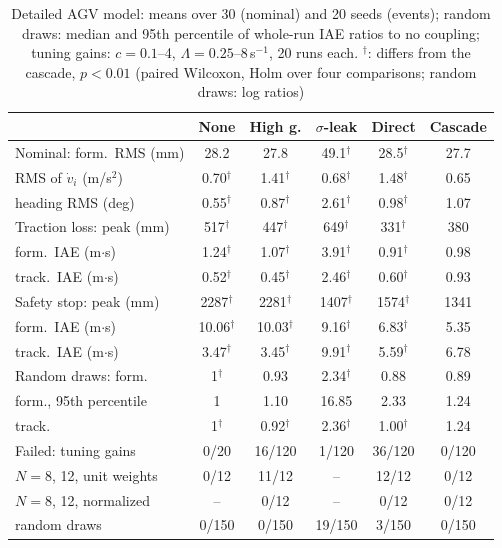 \begin{table}[t]
\caption{Detailed AGV model: means over 30 (nominal) and 20 seeds (events); random draws: median and 95th percentile of whole-run IAE ratios to no coupling; tuning gains: $c=0.1$--4, $\Lambda=0.25$--8\,s$^{-1}$, 20 runs each. $^\dagger$: differs from the cascade, $p<0.01$ (paired Wilcoxon, Holm over four comparisons; random draws: log ratios)}\label{tab:hifi}
\centering\footnotesize\renewcommand{\arraystretch}{0.94}
\setlength{\tabcolsep}{2.0pt}
\begin{tabular}{@{}lccccc@{}}
\toprule
 & None & High g. & $\sigma$-leak & Direct & Cascade\\
\midrule
Nominal: form.\ RMS (mm) & 28.2 & 27.8 & 49.1$^\dagger$ & 28.5$^\dagger$ & 27.7\\
\quad RMS of $\dot v_i$ (m/s$^2$) & 0.70$^\dagger$ & 1.41$^\dagger$ & 0.68$^\dagger$ & 1.48$^\dagger$ & 0.65\\
\quad heading RMS (deg) & 0.55$^\dagger$ & 0.87$^\dagger$ & 2.61$^\dagger$ & 0.98$^\dagger$ & 1.07\\
Traction loss: peak (mm) & 517$^\dagger$ & 447$^\dagger$ & 649$^\dagger$ & 331$^\dagger$ & 380\\
\quad form.\ IAE (m$\cdot$s) & 1.24$^\dagger$ & 1.07$^\dagger$ & 3.91$^\dagger$ & 0.91$^\dagger$ & 0.98\\
\quad track.\ IAE (m$\cdot$s) & 0.52$^\dagger$ & 0.45$^\dagger$ & 2.46$^\dagger$ & 0.60$^\dagger$ & 0.93\\
Safety stop: peak (mm) & 2287$^\dagger$ & 2281$^\dagger$ & 1407$^\dagger$ & 1574$^\dagger$ & 1341\\
\quad form.\ IAE (m$\cdot$s) & 10.06$^\dagger$ & 10.03$^\dagger$ & 9.16$^\dagger$ & 6.83$^\dagger$ & 5.35\\
\quad track.\ IAE (m$\cdot$s) & 3.47$^\dagger$ & 3.45$^\dagger$ & 9.91$^\dagger$ & 5.59$^\dagger$ & 6.78\\
Random draws: form. & 1$^\dagger$ & 0.93 & 2.34$^\dagger$ & 0.88 & 0.89\\
\quad form., 95th percentile & 1 & 1.10 & 16.85 & 2.33 & 1.24\\
\quad track. & 1$^\dagger$ & 0.92$^\dagger$ & 2.36$^\dagger$ & 1.00$^\dagger$ & 1.24\\
Failed: tuning gains & 0/20 & 16/120 & 1/120 & 36/120 & 0/120\\
\quad $N=8$, 12, unit weights & 0/12 & 11/12 & -- & 12/12 & 0/12\\
\quad $N=8$, 12, normalized & -- & 0/12 & -- & 0/12 & 0/12\\
\quad random draws & 0/150 & 0/150 & 19/150 & 3/150 & 0/150\\
\bottomrule
\end{tabular}
\end{table}
